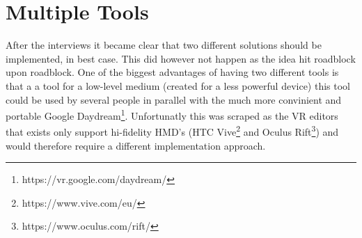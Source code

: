 \section{Multiple Tools}
After the interviews it became clear that two different solutions should be implemented, in best case. This did however not happen as the idea hit roadblock upon roadblock. One of the biggest advantages of having two different tools is that a a tool for a low-level medium (created for a less powerful device) this tool could be used by several people in parallel with the much more convinient and portable Google Daydream\footnote{https://vr.google.com/daydream/}. Unfortunatly this was scraped as the VR editors that exists only support hi-fidelity HMD's (HTC Vive\footnote{https://www.vive.com/eu/} and Oculus Rift\footnote{https://www.oculus.com/rift/}) and would therefore require a different implementation approach.
